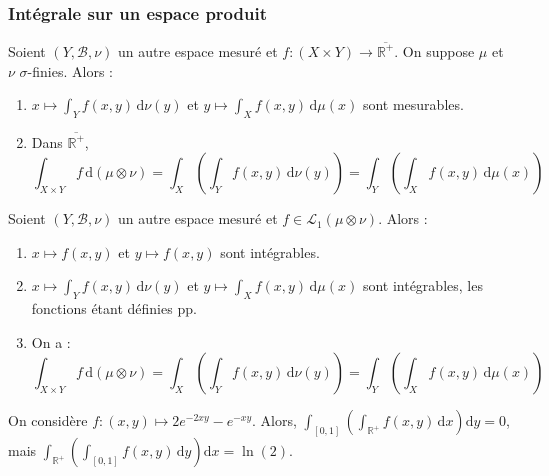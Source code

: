 	\subsubsection{Intégrale sur un espace produit}


	\begin{theorem}
		Soient $(Y, \mathcal{B}, \nu)$ un autre espace mesuré et $f : (X \times Y) \rightarrow \overline{\mathbb{R}^+}$. On suppose $\mu$ et $\nu$ $\sigma$-finies. Alors :
		\begin{enumerate}[label=(\roman*)]
			\item $x \mapsto \int_Y f(x,y) \, \mathrm{d}\nu(y)$ et $y \mapsto \int_X f(x,y) \, \mathrm{d}\mu(x)$ sont mesurables.
			\item Dans $\overline{\mathbb{R}^+}$,
			\[ \int_{X \times Y} f \, \mathrm{d}(\mu \otimes \nu) = \int_X \left( \int_Y f(x,y) \, \mathrm{d}\nu(y) \right) = \int_Y \left( \int_X f(x,y) \, \mathrm{d}\mu(x) \right) \]
		\end{enumerate}
	\end{theorem}

	\begin{theorem}
		Soient $(Y, \mathcal{B}, \nu)$ un autre espace mesuré et $f \in \mathcal{L}_1 (\mu \otimes \nu)$. Alors :
		\begin{enumerate}[label=(\roman*)]
			\item $x \mapsto f(x,y)$ et $y \mapsto f(x,y)$ sont intégrables.
			\item $x \mapsto \int_Y f(x,y) \, \mathrm{d}\nu(y)$ et $y \mapsto \int_X f(x,y) \, \mathrm{d}\mu(x)$ sont intégrables, les fonctions étant définies pp.
			\item On a :
			\[ \int_{X \times Y} f \, \mathrm{d}(\mu \otimes \nu) = \int_X \left( \int_Y f(x,y) \, \mathrm{d}\nu(y) \right) = \int_Y \left( \int_X f(x,y) \, \mathrm{d}\mu(x) \right) \]
		\end{enumerate}
	\end{theorem}

	\begin{cexample}
		On considère $f : (x,y) \mapsto 2e^{-2xy} - e^{-xy}$. Alors, $\int_{[0,1]} \left( \int_{\mathbb{R}^+} f(x,y) \, \mathrm{d}x \right) \mathrm{d}y = 0$, mais $\int_{\mathbb{R}^+} \left( \int_{[0,1]} f(x,y) \, \mathrm{d}y \right) \mathrm{d}x = \ln(2)$.
	\end{cexample}


